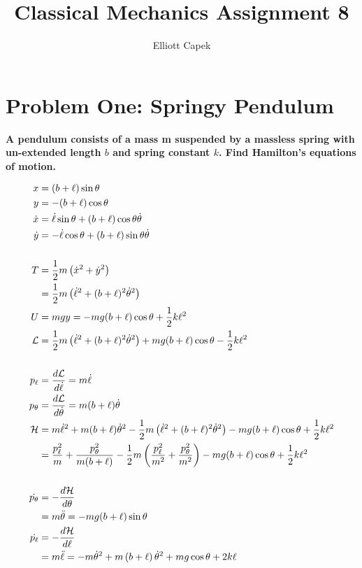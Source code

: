 \documentclass[10pt]{article} %
\title{Classical Mechanics Assignment 8}
\author{Elliott Capek}
\begin{document}
\maketitle{}

\section{Problem One: Springy Pendulum}
\textbf{A pendulum consists of a mass m suspended by a massless spring with un-extended length $b$ and spring constant $k$. Find Hamilton’s equations of motion.}

\begin{align*}
  x &= (b+\ell)\sin\theta\\
  y &= -(b+\ell)\cos\theta\\
  \dot{x} &= \dot{\ell}\sin\theta + (b+\ell)\cos\theta\dot{\theta}\\
  \dot{y} &= -\dot{\ell}\cos\theta + (b+\ell)\sin\theta\dot{\theta}\\
  \vspace{1cm}\\
  T &= \frac{1}{2}m\left(\dot{x}^2 + \dot{y}^2\right)\\
  &= \frac{1}{2}m\left(\dot{\ell}^2 + (b+\ell)^2\dot{\theta}^2\right)\\
  U &= mgy = -mg(b + \ell)\cos\theta + \frac{1}{2}k\ell^2\\
  \mathcal{L} &= \frac{1}{2}m\left(\dot{\ell}^2 + (b+\ell)^2\dot{\theta}^2\right) + mg(b + \ell)\cos\theta - \frac{1}{2}k\ell^2\\
  \vspace{1cm}\\
  p_{\ell} &= \frac{d\mathcal{L}}{d\dot{\ell}} = m\dot{\ell}\\
  p_{\theta} &= \frac{d\mathcal{L}}{d\dot{\theta}} = m(b + \ell)\dot{\theta}\\
  \mathcal{H} &= m\dot{\ell}^2 + m(b + \ell)\dot{\theta}^2 - \frac{1}{2}m\left(\dot{\ell}^2 + (b+\ell)^2\dot{\theta}^2\right) - mg(b + \ell)\cos\theta + \frac{1}{2}k\ell^2\\
  &= \frac{p_{\ell}^2}{m} + \frac{p_{\theta}^2}{m(b + \ell)} - \frac{1}{2}m\left(\frac{p_{\ell}^2}{m^2} + \frac{p_{\theta}^2}{m^2}\right) - mg(b + \ell)\cos\theta + \frac{1}{2}k\ell^2\\
  \vspace{1cm}\\
  \dot{p_{\theta}} &= -\frac{d\mathcal{H}}{d\theta}\\
  &= m\ddot{\theta} = -mg(b + \ell)\sin\theta\\
  \dot{p_{\ell}} &= -\frac{d\mathcal{H}}{d\ell}\\
  &= m\ddot{\ell} = -m\dot{\theta}^2 + m\left(b+\ell\right)\dot{\theta}^2 + mg\cos\theta + 2k\ell\\
\end{align*}
\end{document}
